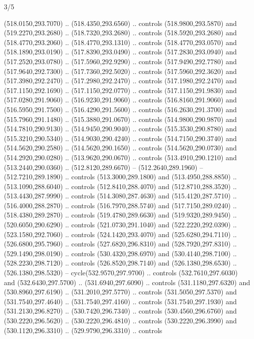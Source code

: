 \begin{flagdescription}{3/5}
\begin{scope}[shift={(0.5\flaglength,0.5\flagwidth)},scale=\flagwidth/1075]
\begin{scope}[y=0.80pt, x=0.80pt, yscale=-2.37, xscale=2.37,xshift=-402,yshift=-230.4]
  (518.0150,293.7070) .. (518.4350,293.6560) .. controls (518.9800,293.5870) and
  (519.2270,293.2680) .. (518.7320,293.2680) .. controls (518.5920,293.2680) and
  (518.4770,293.2060) .. (518.4770,293.1310) .. controls (518.4770,293.0570) and
  (518.1890,293.0190) .. (517.8390,293.0490) .. controls (517.2830,293.0940) and
  (517.2520,293.0780) .. (517.5960,292.9290) .. controls (517.9490,292.7780) and
  (517.9640,292.7300) .. (517.7360,292.5020) .. controls (517.5960,292.3620) and
  (517.3980,292.2470) .. (517.2980,292.2470) .. controls (517.1980,292.2470) and
  (517.1150,292.1690) .. (517.1150,292.0770) .. controls (517.1150,291.9830) and
  (517.0280,291.9060) .. (516.9230,291.9060) .. controls (516.8160,291.9060) and
  (516.5950,291.7500) .. (516.4290,291.5600) .. controls (516.2630,291.3700) and
  (515.7960,291.1480) .. (515.3880,291.0670) .. controls (514.9800,290.9870) and
  (514.7810,290.9130) .. (514.9450,290.9040) .. controls (515.3530,290.8780) and
  (515.3210,290.5340) .. (514.9030,290.4240) .. controls (514.7150,290.3740) and
  (514.5620,290.2580) .. (514.5620,290.1650) .. controls (514.5620,290.0730) and
  (514.2920,290.0280) .. (513.9620,290.0670) .. controls (513.4910,290.1210) and
  (513.2440,290.0360) .. (512.8120,289.6670) -- (512.2640,289.1960) --
  (512.7210,289.1890) .. controls (513.3000,289.1800) and (513.4950,288.8850) ..
  (513.1090,288.6040) .. controls (512.8410,288.4070) and (512.8710,288.3520) ..
  (513.4430,287.9990) .. controls (514.3080,287.4630) and (515.4120,287.5710) ..
  (516.4000,288.2870) .. controls (516.7970,288.5740) and (517.7150,289.0240) ..
  (518.4380,289.2870) .. controls (519.4780,289.6630) and (519.9320,289.9450) ..
  (520.6050,290.6290) .. controls (521.0730,291.1040) and (522.2220,292.0390) ..
  (523.1580,292.7060) .. controls (524.1420,293.4070) and (525.6280,294.7110) ..
  (526.6800,295.7960) .. controls (527.6820,296.8310) and (528.7920,297.8310) ..
  (529.1490,298.0190) .. controls (530.4320,298.6970) and (530.4140,298.7100) ..
  (528.2230,298.7120) .. controls (526.8520,298.7140) and (526.1380,298.6530) ..
  (526.1380,298.5320) -- cycle(532.9570,297.9700) .. controls
  (532.7610,297.6030) and (532.6430,297.5700) .. (531.6940,297.6090) .. controls
  (531.1180,297.6320) and (530.8960,297.6190) .. (531.2010,297.5770) .. controls
  (531.5050,297.5370) and (531.7540,297.4640) .. (531.7540,297.4160) .. controls
  (531.7540,297.1930) and (531.2130,296.8270) .. (530.7420,296.7340) .. controls
  (530.4560,296.6760) and (530.2220,296.5620) .. (530.2220,296.4810) .. controls
  (530.2220,296.3990) and (530.1120,296.3310) .. (529.9790,296.3310) .. controls

\end{scope}
\end{scope}
\end{flagdescription}

